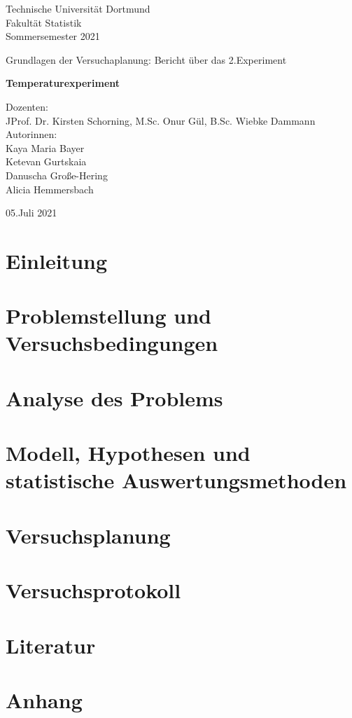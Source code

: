 \documentclass[ ngerman, fontsize= 12pt, paper=a4, headings=big, titlepage=true]{article}
\begin{document}
	
	
\begin{center}
	\Large
	Technische Universität Dortmund\\
	Fakultät Statistik\\
	Sommersemester 2021\\
	
	\vspace{4em}
	
	Grundlagen der Versuchaplanung: Bericht über das 2.Experiment
	
	\Huge
	\textbf{Temperaturexperiment}
	
	\Large
	\vspace{5em}
	Dozenten:\\
	JProf. Dr. Kirsten Schorning, M.Sc. Onur Gül, B.Sc. Wiebke Dammann\\
	
	
	\vspace{3em}
	Autorinnen: \\
	Kaya Maria Bayer\\
	Ketevan Gurtskaia\\
    Danuscha Große-Hering\\	
	Alicia Hemmersbach\\

	
	
	\vspace{4em}
	
	05.Juli 2021
	
\end{center}

\newpage	

\tableofcontents
\newpage

\section{Einleitung}
\section{Problemstellung und Versuchsbedingungen}
\section{Analyse des Problems}
\section{Modell, Hypothesen und statistische Auswertungsmethoden}
\section{Versuchsplanung}
\cite{aristotle:physics}
\section{Versuchsprotokoll}
\section{Literatur}
 



\section{Anhang}
	
	
	
\end{document}
